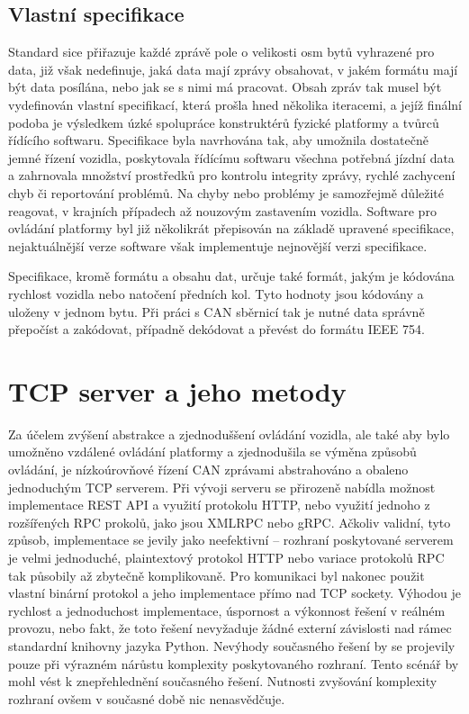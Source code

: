\documentclass[czech, bachelor]{diploma}
\begin{document}
\subsection{Vlastní specifikace}
Standard sice přiřazuje každé zprávě pole o velikosti osm bytů vyhrazené pro data, již však nedefinuje, jaká data mají zprávy
obsahovat, v jakém formátu mají být data posílána, nebo jak se s nimi má pracovat. Obsah zpráv tak musel být vydefinován vlastní
specifikací, která prošla hned několika iteracemi, a jejíž finální podoba je výsledkem úzké spolupráce konstruktérů fyzické
platformy a tvůrců řídícího softwaru. Specifikace byla navrhována tak, aby umožnila dostatečně jemné řízení vozidla, poskytovala
řídícímu softwaru všechna potřebná jízdní data a zahrnovala množství prostředků pro kontrolu integrity zprávy, rychlé zachycení
chyb či reportování problémů. Na chyby nebo problémy je samozřejmě důležité reagovat, v krajních případech až nouzovým zastavením
vozidla. Software pro ovládání platformy byl již několikrát přepisován na základě upravené specifikace, nejaktuálnější verze
software však implementuje nejnovější verzi specifikace.

Specifikace, kromě formátu a obsahu dat, určuje také formát, jakým je kódována rychlost vozidla nebo natočení předních kol. Tyto
hodnoty jsou kódovány a uloženy v jednom bytu. Při práci s CAN sběrnicí tak je nutné data správně přepočíst a zakódovat, případně
dekódovat a převést do formátu IEEE 754.

\section{TCP server a jeho metody} \label{server-methods}

Za účelem zvýšení abstrakce a zjednoduššení ovládání vozidla, ale také aby bylo umožněno vzdálené ovládání platformy
a zjednodušila se výměna způsobů ovládání, je nízkoúrovňové řízení CAN zprávami abstrahováno a obaleno jednoduchým TCP serverem.
Při vývoji serveru se přirozeně nabídla možnost implementace REST API a využití protokolu HTTP, nebo využití jednoho z rozšířených
RPC prokolů, jako jsou XMLRPC nebo gRPC. Ačkoliv validní, tyto způsob, implementace se jevily jako neefektivní -- rozhraní
poskytované serverem je velmi jednoduché, plaintextový protokol HTTP nebo variace protokolů RPC tak působily až zbytečně
komplikovaně. Pro komunikaci byl nakonec použit vlastní binární protokol a jeho implementace přímo nad TCP sockety.
Výhodou je rychlost a jednoduchost implementace, úspornost a výkonnost řešení v reálném provozu, nebo fakt, že toto řešení
nevyžaduje žádné externí závislosti nad rámec standardní knihovny jazyka Python. Nevýhody současného řešení by se projevily
pouze při výrazném nárůstu komplexity poskytovaného rozhraní. Tento scénář by mohl vést k znepřehlednění současného řešení.
Nutnosti zvyšování komplexity rozhraní ovšem v současné době nic nenasvědčuje.
\end{document}
